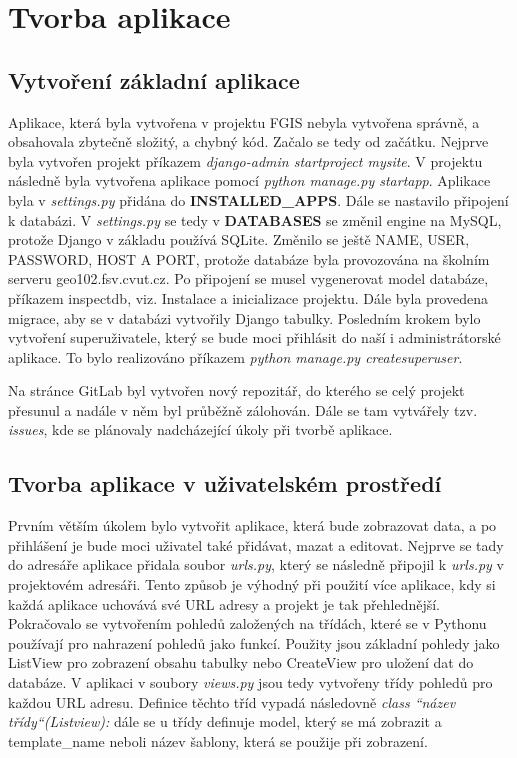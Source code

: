\chapter{Tvorba aplikace}
\label{4-tvorba-aplikace}

\section{Vytvoření základní aplikace}

Aplikace, která byla vytvořena v projektu FGIS nebyla vytvořena
správně, a obsahovala zbytečně složitý, a chybný kód. Začalo se tedy
od začátku. Nejprve byla vytvořen projekt příkazem \emph{django-admin
  startproject mysite}. V projektu následně byla vytvořena aplikace
pomocí \emph{python manage.py startapp}. Aplikace byla v
\emph{settings.py} přidána do \textbf{INSTALLED\_APPS}. Dále se
nastavilo připojení k databázi. V \emph{settings.py} se tedy v
\textbf{DATABASES} se změnil engine na MySQL, protože Django v základu
používá SQLite. Změnilo se ještě NAME, USER, PASSWORD, HOST A PORT,
protože databáze byla provozována na školním serveru
geo102.fsv.cvut.cz. Po připojení se musel vygenerovat model databáze,
příkazem inspectdb, viz. Instalace a inicializace projektu. Dále byla
provedena migrace, aby se v databázi vytvořily Django
tabulky. Posledním krokem bylo vytvoření superuživatele, který se bude
moci přihlásit do naší i administrátorské aplikace. To bylo
realizováno příkazem \emph{python manage.py createsuperuser}.

Na stránce GitLab byl vytvořen nový repozitář, do kterého se celý
projekt přesunul a nadále v něm byl průběžně zálohován. Dále se tam
vytvářely tzv. \emph{issues}, kde se plánovaly nadcházející úkoly při
tvorbě aplikace.

\section{Tvorba aplikace v uživatelském prostředí}

Prvním větším úkolem bylo vytvořit aplikace, která bude zobrazovat
data, a po přihlášení je bude moci uživatel také přidávat, mazat a
editovat. Nejprve se tady do adresáře aplikace přidala soubor  \emph{urls.py},
který se následně připojil k \emph{urls.py} v projektovém adresáři. Tento
způsob je výhodný při použití více aplikace, kdy si každá aplikace
uchovává své URL adresy a projekt je tak přehlednější. Pokračovalo se
vytvořením pohledů založených na třídách, které se v Pythonu používají
pro nahrazení pohledů jako funkcí. Použity jsou základní pohledy jako
ListView pro zobrazení obsahu tabulky nebo CreateView pro uložení dat
do databáze. V aplikaci v soubory \emph{views.py} jsou tedy vytvořeny
třídy pohledů pro každou URL adresu. Definice těchto tříd vypadá
následovně \emph{class “název třídy“(Listview):} dále se u třídy
definuje model, který se má zobrazit a template\_name neboli název
šablony, která se použije při zobrazení.

